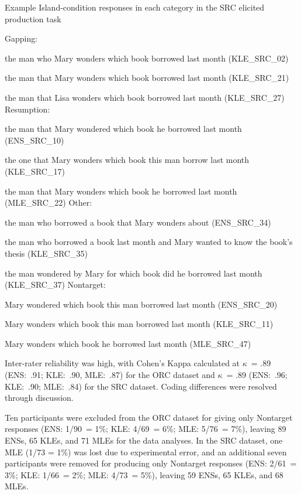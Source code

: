 \pex Example Island-condition responses in each category in the SRC elicited production task \label{ex-ept-sample-src}\par\nobreak
\a Gapping: \par\nobreak\vspace{5pt}
the man who Mary wonders which book borrowed last month (KLE\_SRC\_02) \par\nobreak
the man that Mary wonders which book borrowed last month (KLE\_SRC\_21) \par\nobreak 
the man that Lisa wonders which book borrowed last month (KLE\_SRC\_27)
\a Resumption: \par\nobreak\vspace{5pt}
the man that Mary wondered which book he borrowed last month (ENS\_SRC\_10) \par\nobreak 
the one that Mary wonders which book this man borrow last month (KLE\_SRC\_17) \par\nobreak 
the man that Mary wonders which book he borrowed last month (MLE\_SRC\_22) 
\a Other: \par\nobreak\vspace{5pt}
the man who borrowed a book that Mary wonders about (ENS\_SRC\_34) \par\nobreak 
the man who borrowed a book last month and Mary wanted to know the book's thesis (KLE\_SRC\_35) \par\nobreak 
the man wondered by Mary for which book did he borrowed last month (KLE\_SRC\_37)
\a Nontarget: \par\nobreak\vspace{5pt}
Mary wondered which book this man borrowed last month (ENS\_SRC\_20) \par\nobreak 
Mary wonders which book this man borrowed last month (KLE\_SRC\_11) \par\nobreak 
Mary wonders which book he borrowed last month (MLE\_SRC\_47)
\xe 

\noindent Inter-rater reliability was high, with Cohen's Kappa calculated at $\kappa$~= .89 (ENS:~.91; KLE:~.90, MLE:~.87) for the ORC dataset and $\kappa$~= .89 (ENS:~.96; KLE:~.90; MLE:~.84) for the SRC dataset. Coding differences were resolved through discussion.

Ten participants were excluded from the ORC dataset for giving only Nontarget responses (ENS: 1/90~= 1\%; KLE: 4/69~= 6\%; MLE: 5/76~= 7\%), leaving 89 ENSs, 65 KLEs, and 71 MLEs for the data analyses. In the SRC dataset, one MLE (1/73 = 1\%) was lost due to experimental error, and an additional seven participants were removed for producing only Nontarget responses (ENS: 2/61~= 3\%; KLE: 1/66~= 2\%; MLE: 4/73~= 5\%), leaving 59 ENSs, 65 KLEs, and 68 MLEs.

